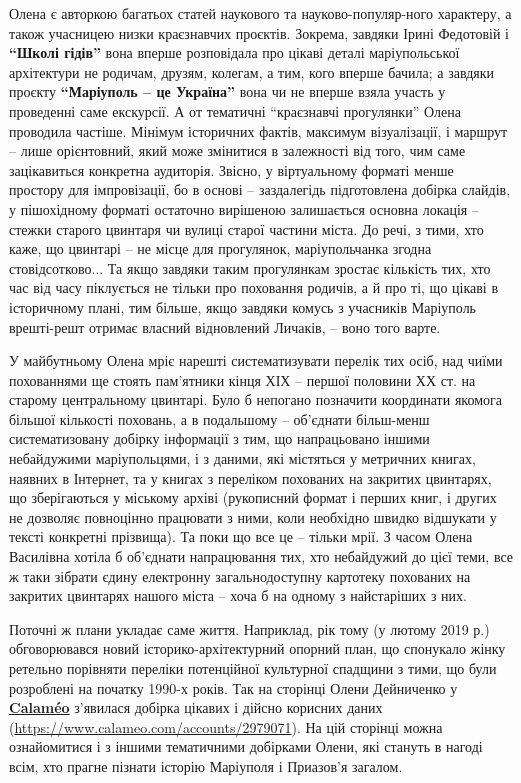 
Олена є авторкою багатьох статей наукового та науково-популяр\hyp{}ного характеру, а
також учасницею низки краєзнавчих проєктів. Зокрема, завдяки Ірині Федотовій і
\textbf{\enquote{Школі гідів}} вона вперше розповідала про цікаві деталі маріупольської
архітектури не родичам, друзям, колегам, а тим, кого вперше бачила; а завдяки
проєкту \textbf{\enquote{Маріуполь – це Україна}} вона чи не вперше взяла участь у проведенні
саме екскурсії. А от тематичні \enquote{краєзнавчі прогулянки} Олена проводила частіше.
Мінімум історичних фактів, максимум візуалізації, і маршрут – лише орієнтовний,
який може змінитися в залежності від того, чим саме зацікавиться конкретна
аудиторія. Звісно, у віртуальному форматі менше простору для імпровізації, бо в
основі – заздалегідь підготовлена добірка слайдів, у пішохідному форматі
остаточно вирішеною залишається основна локація – стежки старого цвинтаря чи
вулиці старої частини міста. До речі, з тими, хто каже, що цвинтарі – не місце
для прогулянок, маріупольчанка згодна стовідсотково... Та якщо завдяки таким
прогулянкам зростає кількість тих, хто час від часу піклується не тільки про
поховання родичів, а й про ті, що цікаві в історичному плані, тим більше, якщо
завдяки комусь з учасників Маріуполь врешті-решт отримає власний відновлений
Личаків, – воно того варте.

У майбутньому Олена мріє нарешті систематизувати перелік тих осіб, над чиїми
похованнями ще стоять пам'ятники кінця ХІХ – першої половини ХХ ст. на старому
центральному цвинтарі. Було б непогано позначити координати якомога більшої
кількості поховань, а в подальшому – об'єднати більш-менш систематизовану
добірку інформації з тим, що напрацьовано іншими небайдужими маріупольцями, і з
даними, які містяться у метричних книгах, наявних в Інтернет, та у книгах з
переліком похованих на закритих цвинтарях, що зберігаються у міському архіві
(рукописний формат і перших книг, і других не дозволяє повноцінно працювати з
ними, коли необхідно швидко відшукати у тексті конкретні прізвища). Та поки що
все це – тільки мрії. З часом Олена Василівна хотіла б об'єднати напрацювання
тих, хто небайдужий до цієї теми, все ж таки зібрати єдину електронну
загальнодоступну картотеку похованих на закритих цвинтарях нашого міста – хоча
б на одному з найстаріших з них. 

Поточні ж плани укладає саме життя. Наприклад, рік тому (у лютому 2019 р.)
обговорювався новий історико-архітектурний опорний план, що спонукало жінку
ретельно порівняти переліки потенційної культурної спадщини з тими, що були
розроблені на початку 1990-х років. Так на сторінці Олени Дейниченко у \underline{\textbf{Calaméo}}
з'явилася добірка цікавих і дійсно корисних даних
(\url{https://www.calameo.com/accounts/2979071}). На цій сторінці можна
ознайомитися і з іншими тематичними добірками Олени, які стануть в нагоді всім,
хто прагне пізнати історію Маріуполя і Приазов'я загалом.

